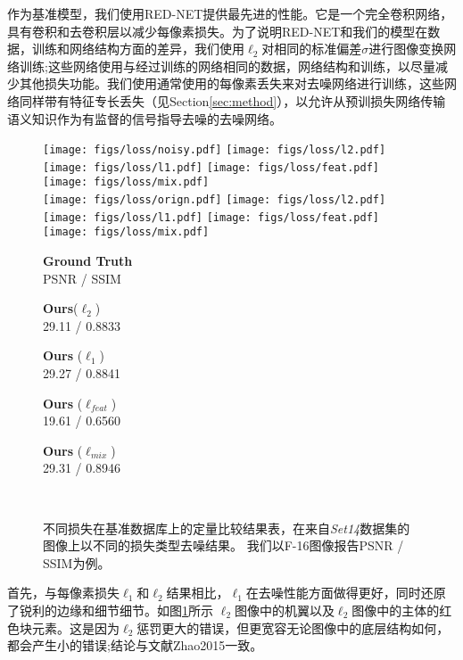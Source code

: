 作为基准模型，我们使用RED-NET\cite{Mao2016}提供最先进的性能。它是一个完全卷积网络，具有卷积和去卷积层以减少每像素损失。为了说明RED-NET和我们的模型在数据，训练和网络结构方面的差异，我们使用$ \ell_{2} $对相同的标准偏差$ \sigma $进行图像变换网络训练;这些网络使用与经过训练的网络相同的数据，网络结构和训练，以尽量减少其他损失功能。我们使用通常使用的每像素丢失来对去噪网络进行训练，这些网络同样带有特征专长丢失（见Section\ref{sec:method}），以允许从预训损失网络传输语义知识作为有监督的信号指导去噪的去噪网络。

\begin{figure}[t]
\centering
  \texttt{[image: figs/loss/noisy.pdf]}
  \texttt{[image: figs/loss/l2.pdf]}
  \texttt{[image: figs/loss/l1.pdf]}
  \texttt{[image: figs/loss/feat.pdf]}
  \texttt{[image: figs/loss/mix.pdf]}  \\{}
  \texttt{[image: figs/loss/orign.pdf]}
  \texttt{[image: figs/loss/l2.pdf]}
  \texttt{[image: figs/loss/l1.pdf]}
  \texttt{[image: figs/loss/feat.pdf]}
  \texttt{[image: figs/loss/mix.pdf]} \\
   \begin{minipage}{0.17\textwidth}
        \centering \textbf{Ground Truth} \\ PSNR / SSIM
   \end{minipage}
   \begin{minipage}{0.17\textwidth}
     \centering \textbf{Ours}($\ell_{2}$) \\ 29.11 / 0.8833
   \end{minipage}
   \begin{minipage}{0.17\textwidth}
     \centering \textbf{Ours} ($\ell_{1}$) \\ 29.27 / 0.8841
   \end{minipage}
   \begin{minipage}{0.17\textwidth}
     \centering \textbf{Ours} ($\ell_{feat}$) \\  19.61 / 0.6560
   \end{minipage}
   \begin{minipage}{0.17\textwidth}
     \centering \textbf{Ours} ($\ell_{mix}$) \\  29.31 / 0.8946
   \end{minipage} \\
  \caption[不同损失在基准数据库上的定量比较结果表]{不同损失在基准数据库上的定量比较结果表，在来自{\it Set14}数据集的图像上以不同的损失类型去噪结果。 我们以F-16图像报告PSNR / SSIM为例。 
  }
  \vspace{-4mm}
  \label{fig:l1-l2-feat-results}
\end{figure}
首先，与每像素损失$ \ell_{1} $和$ \ell_{2} $结果相比，$ \ell_{1} $在去噪性能方面做得更好，同时还原了锐利的边缘和细节细节。如图\ref{fig:l1-l2-feat-results}所示
$ \ell_{2} $图像中的机翼以及$ \ell_{2} $图像中的主体的红色块元素。这是因为$ \ell_{2} $惩罚更大的错误，但更宽容无论图像中的底层结构如何，都会产生小的错误;结论与文献{Zhao2015}一致。

